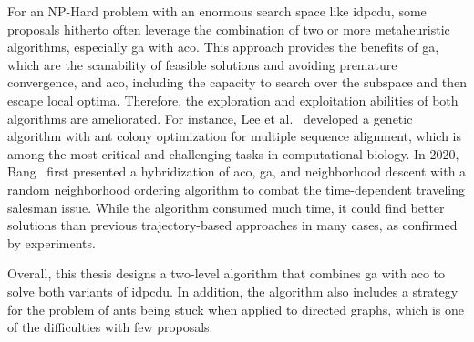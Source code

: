 For an NP-Hard problem with an enormous search space like \gls{idpcdu}, some proposals hitherto often leverage the combination of two or more metaheuristic algorithms, especially \gls{ga} with \gls{aco}. This approach provides the benefits of \gls{ga}, which are the scanability of feasible solutions and avoiding premature convergence, and \gls{aco}, including the capacity to search over the subspace and then escape local optima. Therefore, the exploration and exploitation abilities of both algorithms are ameliorated. For instance, Lee et al.~\cite{lee2008genetic} developed a genetic algorithm with ant colony optimization for multiple sequence alignment, which is among the most critical and challenging tasks in computational biology. In 2020, Bang~\cite{ban2020hybridization} first presented a hybridization of \gls{aco}, \gls{ga}, and neighborhood descent with a random neighborhood ordering algorithm to combat the time-dependent traveling salesman issue. While the algorithm consumed much time, it could find better solutions than previous trajectory-based approaches in many cases, as confirmed by experiments.  

Overall, this thesis designs a two-level algorithm that combines \gls{ga} with \gls{aco} to solve both variants of \gls{idpcdu}. In addition, the algorithm also includes a strategy for the problem of ants being stuck when applied to directed graphs, which is one of the difficulties with few proposals. 